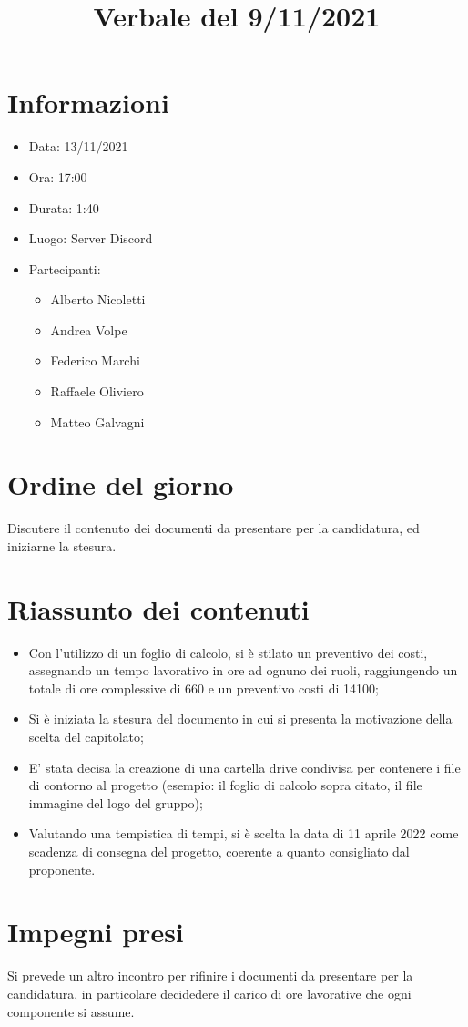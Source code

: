 \documentclass[a4paper,12pt]{article}
\author{}
\date{}
\begin{document}

\title{Verbale del 9/11/2021}
\maketitle

\section{Informazioni}

\begin{itemize}
\item Data: 13/11/2021
\item Ora: 17:00
\item Durata: 1:40
\item Luogo: Server Discord
\item Partecipanti: 
\begin{itemize}
\item Alberto Nicoletti
\item Andrea Volpe
\item Federico Marchi
\item Raffaele Oliviero
\item Matteo Galvagni
\end{itemize}
\end{itemize}

\section{Ordine del giorno}
Discutere il contenuto dei documenti da presentare per la candidatura, ed iniziarne la stesura.

\section{Riassunto dei contenuti}

\begin{itemize}
\item Con l'utilizzo di un foglio di calcolo, si è stilato un preventivo dei costi, assegnando un tempo lavorativo in ore ad ognuno dei ruoli, raggiungendo un totale di ore complessive di 660 e un preventivo costi di 14100;
\item Si è iniziata la stesura del documento in cui si presenta la motivazione della scelta del capitolato;
\item E' stata decisa la creazione di una cartella drive condivisa per contenere i file di contorno al progetto (esempio: il foglio di calcolo sopra citato, il file immagine del logo del gruppo);
\item Valutando una tempistica di tempi, si è scelta la data di 11 aprile 2022 come scadenza di consegna del progetto, coerente a quanto consigliato dal proponente.
\end{itemize}

\section{Impegni presi}
Si prevede un altro incontro per rifinire i documenti da presentare per la candidatura, in particolare decidedere il carico di ore lavorative che ogni componente si assume.
\end{document}
